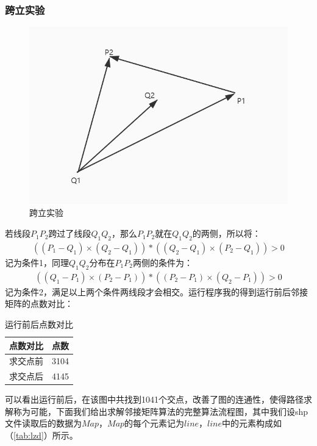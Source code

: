 \subsubsection{跨立实验}
\begin{figure}[H]
    \centering
    \includegraphics[width=13cm]{figure/kl.jpg}%
    \caption{跨立实验}
    \label{fig:kl}
\end{figure}
若线段$P_1P_2$跨过了线段$Q_1Q_2$，那么$P_1P_2$就在$Q_1Q_2$的两侧，所以将：
\begin{align}
    ((P_1-Q_1) \times (Q_2-Q_1)) *((Q_2-Q_1) \times (P_2-Q_1)) > 0 \label{kl1}
\end{align}
记为条件1，同理$Q_1Q_2$分布在$P_1P_2$两侧的条件为：
\begin{align}
    ((Q_1-P_1)\times(P_2-P_1))*((P_2-P_1)\times(Q_2-P_1))>0 \label{kl2}
\end{align}
记为条件2，满足以上两个条件两线段才会相交。运行程序我的得到运行前后邻接矩阵的点数对比：\\
\begin{table}[H]
    \centering
    \caption{运行前后点数对比}
      \begin{tabular}{|l|r|}
      \hline
      点数对比  & \multicolumn{1}{l|}{点数} \\
      \hline
      求交点前  & 3104 \\
      求交点后  & 4145 \\
      \hline
      \end{tabular}%
    \label{tab:dsdb}%
  \end{table}%
可以看出运行前后，在该图中共找到1041个交点，改善了图的连通性，使得路径求解称为可能，下面我们给出求解邻接矩阵算法的完整算法流程图，其中我们设shp文件读取后的数据为$Map$，$Map$的每个元素记为$line$，$line$中的元素构成如（\ref{tab:lzd}）所示。

